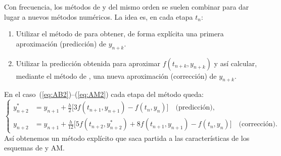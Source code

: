 \begin{example}
  Con frecuencia, los métodos de \AB y \AM del mismo orden se suelen
  combinar para dar lugar a nuevos métodos numéricos. La idea es, en
  cada etapa $t_n$:
  \begin{enumerate}
  \item Utilizar el método de \AB para obtener, de forma explícita una
    primera aproximación (predicción) de $y_{n+k}$.
  \item Utilizar la predicción obtenida para aproximar
    $f(t_{n+k},y_{n+k})$ y así calcular, mediante el método de \AM,
    una nueva aproximación (corrección) de $y_{n+k}$.
  \end{enumerate}
  
  En el caso~(\ref{eq:AB2})--(\ref{eq:AM2}) cada etapa del método
  queda:
  \begin{equation*}\left\{
      \begin{aligned}
        y^*_{n+2} &= y_{n+1} + \frac{h}{2} \big[ 3f(t_{n+1},y_{n+1}) -
        f(t_{n},y_{n}) \big] \quad \text{(predicción),}
        \\
        y_{n+2} &= y_{n+1} + \frac{h}{12} \big[ 5f(t_{n+2},y^*_{n+2}) 
        + 8 f(t_{n+1},y_{n+1}) - f(t_{n},y_{n}) \big] \quad
        \text{(corrección).}
      \end{aligned}\right.
  \end{equation*}
  Así obtenemos un método explícito que saca partida a las
  características de los esquemas de \AB y AM.
  \end{example}
